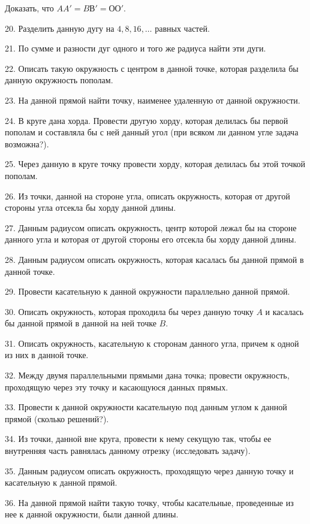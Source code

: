 \documentclass[oneside]{book}
\begin{document}
Доказать, что $AA' = BВ' = ОО'$.


20.
Разделить данную дугу на $4, 8, 16, \dots$
равных частей.

21.
По сумме и разности дуг одного и того же радиуса найти эти дуги.

22.
Описать такую окружность с центром в данной точке, которая разделила бы данную окружность пополам.

23.
На данной прямой найти точку, наименее удаленную от данной окружности.

24.
В круге дана хорда.
Провести другую хорду, которая делилась бы первой пополам и составляла бы с ней данный угол (при всяком ли данном угле задача возможна?).

25.
Через данную в круге точку провести хорду, которая делилась бы этой точкой пополам.

26.
Из точки, данной на стороне угла, описать окружность, которая от другой стороны угла отсекла бы хорду данной длины.

27.
Данным радиусом описать окружность, центр которой лежал бы на стороне данного угла и которая от другой стороны его отсекла бы хорду данной длины.

28.
Данным радиусом описать окружность, которая касалась бы данной прямой в данной точке.

29.
Провести касательную к данной окружности параллельно данной прямой.

30.
Описать окружность, которая проходила бы через данную точку $A$ и касалась бы данной прямой в данной на ней точке $B$.

31.
Описать окружность, касательную к сторонам данного угла, причем к одной из них в данной точке.

32.
Между двумя параллельными прямыми дана точка;
провести окружность, проходящую через эту точку и касающуюся данных прямых.

33.
Провести к данной окружности касательную под данным углом к данной прямой (сколько решений?).

34.
Из точки, данной вне круга, провести к нему секущую так, чтобы ее внутренняя часть равнялась данному отрезку (исследовать задачу).

35.
Данным радиусом описать окружность, проходящую через данную точку и касательную к данной прямой.

36.
На данной прямой найти такую точку, чтобы касательные, проведенные из нее к данной окружности, были данной длины.
\end{document}
